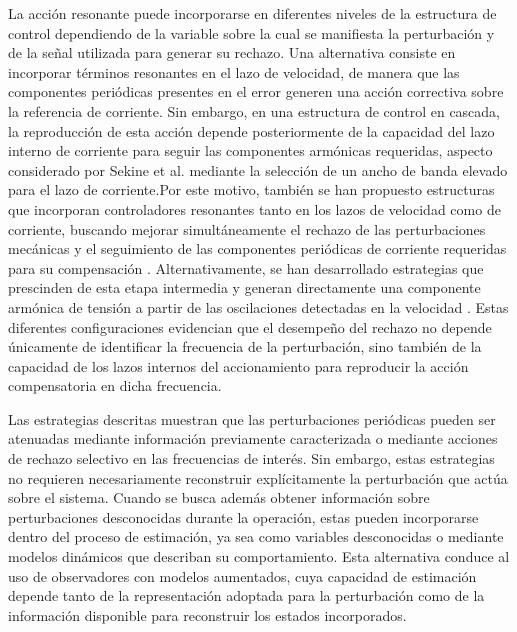 La acción resonante puede incorporarse en diferentes niveles de la estructura de control dependiendo de la variable sobre la cual se manifiesta la perturbación y de la señal utilizada para generar su rechazo. Una alternativa consiste en incorporar términos resonantes en el lazo de velocidad, de manera que las componentes periódicas presentes en el error generen una acción correctiva sobre la referencia de corriente. Sin embargo, en una estructura de control en cascada, la reproducción de esta acción depende posteriormente de la capacidad del lazo interno de corriente para seguir las componentes armónicas requeridas, aspecto considerado por Sekine et al. \cite{sekineSuppressionVelocityPulsations2024} mediante la selección de un ancho de banda elevado para el lazo de corriente.Por este motivo, también se han propuesto estructuras que incorporan
controladores resonantes tanto en los lazos de velocidad como de corriente,
buscando mejorar simultáneamente el rechazo de las perturbaciones mecánicas
y el seguimiento de las componentes periódicas de corriente requeridas para
su compensación \cite{sangeethaSpeedCurrentHarmonics2025}. Alternativamente, se han desarrollado estrategias que prescinden de esta etapa intermedia y generan directamente una componente armónica de tensión a partir de las oscilaciones detectadas en la velocidad \cite{wangTorqueRippleMinimization2025}. Estas diferentes configuraciones evidencian que el desempeño del rechazo no depende únicamente de identificar la frecuencia de la perturbación, sino también de la capacidad de los lazos internos del accionamiento para reproducir la acción compensatoria en dicha frecuencia.

Las estrategias descritas muestran que las perturbaciones periódicas pueden ser atenuadas mediante información previamente caracterizada o mediante acciones de rechazo selectivo en las frecuencias de interés. Sin embargo, estas estrategias no requieren necesariamente reconstruir explícitamente la perturbación que actúa sobre el sistema. Cuando se busca además obtener información sobre perturbaciones desconocidas durante la operación, estas pueden incorporarse dentro del proceso de estimación, ya sea como variables desconocidas o mediante modelos dinámicos que describan su comportamiento. Esta alternativa conduce al uso de observadores con modelos aumentados, cuya capacidad de estimación depende tanto de la representación adoptada para la perturbación como de la información disponible para reconstruir los estados incorporados.

